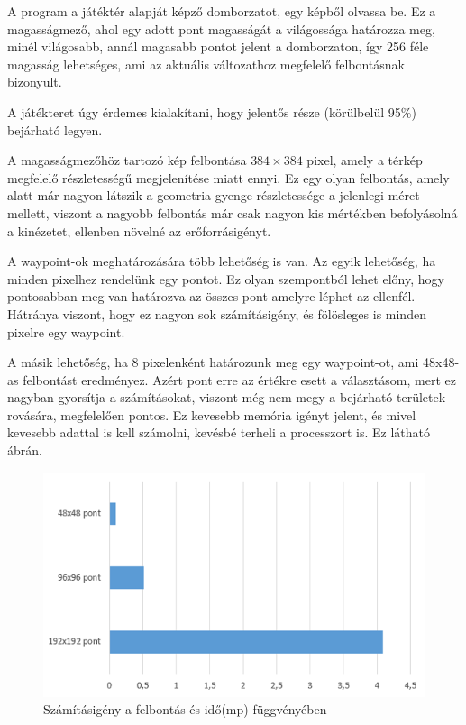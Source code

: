 A program a játéktér alapját képző domborzatot, egy képből olvassa be. Ez a magasságmező, ahol egy adott pont magasságát a világossága határozza meg, minél világosabb, annál magasabb pontot jelent a domborzaton, így 256 féle magasság lehetséges, ami az aktuális változathoz megfelelő felbontásnak bizonyult. 

A játékteret úgy érdemes kialakítani, hogy jelentős része (körülbelül 95\%) bejárható legyen.

A magasságmezőhöz tartozó kép felbontása $384 \times 384$ pixel, amely a térkép megfelelő részletességű megjelenítése miatt ennyi. Ez egy olyan felbontás, amely alatt már nagyon látszik a geometria gyenge részletessége a jelenlegi méret mellett, viszont a nagyobb felbontás már csak nagyon kis mértékben befolyásolná a kinézetet, ellenben növelné az erőforrásigényt. 

A waypoint-ok meghatározására több lehetőség is van. Az egyik lehetőség, ha minden pixelhez rendelünk egy pontot. Ez olyan szempontból lehet előny, hogy pontosabban meg van határozva az összes pont amelyre léphet az ellenfél. Hátránya viszont, hogy ez nagyon sok számításigény, és fölösleges is minden pixelre egy waypoint.

A másik lehetőség, ha 8 pixelenként határozunk meg egy waypoint-ot, ami 48x48-as felbontást eredményez. Azért pont erre az értékre esett a választásom, mert ez nagyban gyorsítja a számításokat, viszont még nem megy a bejárható területek rovására, megfelelően pontos. Ez kevesebb memória igényt jelent, és mivel kevesebb adattal is kell számolni, kevésbé terheli a processzort is. Ez látható  ábrán.

\begin{figure}[h]
\centering
\includegraphics[scale=0.9]{kepek/utvonal_szamitas_diagram_waypointokra.png}
\caption{Számításigény a felbontás és idő(mp) függvényében}
\label{fig:diagram_utvonal}
\end{figure}

